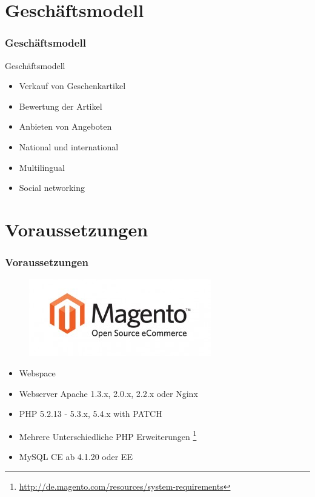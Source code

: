 \documentclass[xcolor=dvipsnames]{beamer}
\begin{document}
\section{Geschäftsmodell}
\begin{frame} %
  \frametitle{Geschäftsmodell} %
  \begin{block}{Geschäftsmodell}
	  \begin{itemize}
		\item Verkauf von Geschenkartikel
		\item Bewertung der Artikel
		\item Anbieten von Angeboten
		\item National und international
		\item Multilingual
		\item Social networking
	  \end{itemize}
  \end{block}
\end{frame}

\section{Voraussetzungen}
\begin{frame} %
  \frametitle{Voraussetzungen} %
  
	\begin{figure}
	\includegraphics[scale=0.4]{magento-logo-300x127.jpg}
	\end{figure}

\begin{block}{}
	  \begin{itemize}
		\item Webspace
		\item Webserver Apache 1.3.x, 2.0.x, 2.2.x oder Nginx
		\item PHP 5.2.13 - 5.3.x, 5.4.x with PATCH 
		\item Mehrere Unterschiedliche PHP Erweiterungen \footnote{\url{http://de.magento.com/resources/system-requirements}}
		\item MySQL CE ab 4.1.20 oder EE 
	  \end{itemize}
  \end{block}
\end{frame}
\end{document}
